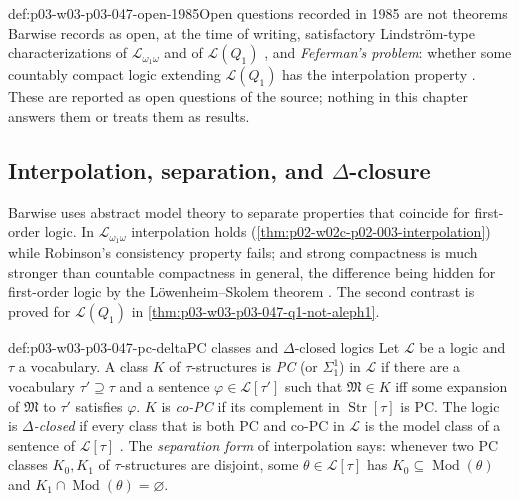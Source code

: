 \begin{hbwarning}{def:p03-w03-p03-047-open-1985}{Open questions recorded in 1985 are not theorems}
Barwise records as open, at the time of writing, satisfactory Lindstr\"om-type
characterizations of \(\mathscr L_{\omega_1\omega}\) and of
\(\mathscr L(Q_1)\) \cite[Ch.~I, \S2.2, p.~15]{Barwise1985BackgroundAims}, and
\emph{Feferman's problem}: whether some countably compact logic extending
\(\mathscr L(Q_1)\) has the interpolation property
\cite[Ch.~I, \S2.4, p.~17]{Barwise1985BackgroundAims}.  These are reported as
open questions of the source; nothing in this chapter answers them or treats
them as results.
\end{hbwarning}

\subsection{Interpolation, separation, and \(\Delta\)-closure}

Barwise uses abstract model theory to separate properties that coincide for
first-order logic.  In \(\mathscr L_{\omega_1\omega}\) interpolation holds
(\cref{thm:p02-w02c-p02-003-interpolation}) while Robinson's consistency
property fails; and strong compactness is much
stronger than countable compactness in general, the difference being hidden
for first-order logic by the L\"owenheim--Skolem theorem
\cite[Ch.~I, \S2.3, p.~16]{Barwise1985BackgroundAims}.  The second contrast is
proved for \(\mathscr L(Q_1)\) in \cref{thm:p03-w03-p03-047-q1-not-aleph1}.

\begin{hbdefinition}{def:p03-w03-p03-047-pc-delta}{PC classes and \(\Delta\)-closed logics}
Let \(\mathscr L\) be a logic and \(\tau\) a vocabulary.  A class \(K\) of
\(\tau\)-structures is \emph{PC} (or \(\Sigma^1_1\)) in \(\mathscr L\) if
there are a vocabulary \(\tau'\supseteq\tau\) and a sentence
\(\varphi\in\mathscr L[\tau']\) such that \(\mathfrak M\in K\) iff some
expansion of \(\mathfrak M\) to \(\tau'\) satisfies \(\varphi\).  \(K\) is
\emph{co-PC} if its complement in \(\operatorname{Str}[\tau]\) is PC.  The
logic is \emph{\(\Delta\)-closed} if every class that is both PC and co-PC in
\(\mathscr L\) is the model class of a sentence of \(\mathscr L[\tau]\)
\cite[Ch.~I, \S2.4, pp.~17--18]{Barwise1985BackgroundAims}.  The
\emph{separation form} of interpolation says: whenever two PC classes
\(K_0,K_1\) of \(\tau\)-structures are disjoint, some
\(\theta\in\mathscr L[\tau]\) has \(K_0\subseteq\operatorname{Mod}(\theta)\)
and \(K_1\cap\operatorname{Mod}(\theta)=\varnothing\).
\end{hbdefinition}

